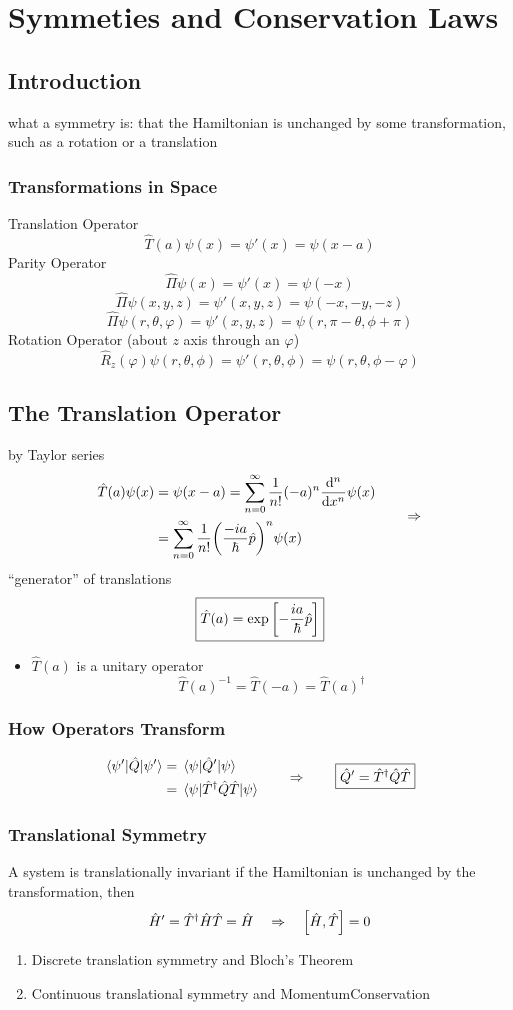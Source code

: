 \chapter{Symmeties and Conservation Laws}

\section{Introduction}
what a symmetry is: that the Hamiltonian is unchanged by some transformation, such as a rotation or a translation 
\subsection{Transformations in Space}
Translation Operator
\[\hat{T}(a)\psi(x)=\psi'(x)=\psi(x-a)\]
Parity Operator
\[\hat{\Pi}\psi(x)=\psi'(x)=\psi(-x)\]
\[\hat{\Pi}\psi(x,y,z)=\psi'(x,y,z)=\psi(-x,-y,-z)\]
\[\hat{\Pi}\psi(r,\theta,\varphi)=\psi'(x,y,z)=\psi(r,\pi-\theta,\phi+\pi)\]
Rotation Operator (about \(z\) axis through an \(\varphi\))
\[\hat{R}_z(\varphi)\psi(r,\theta,\phi)=\psi'(r,\theta,\phi)=\psi(r,\theta,\phi-\varphi)\]
\section{The Translation Operator}
by Taylor series
\[\begin{aligned}
    \hat{T}(a)\psi(x)&=\psi(x-a)=\sum_{n=0}^\infty\frac{1}{n!}(-a)^n\dv[n]{x}\psi(x) \\
                    &=\sum_{n=0}^\infty\frac{1}{n!}\qty(\frac{-ia}{\hbar}\hat{p})^n\psi(x)
\end{aligned}\qquad\Rightarrow\]
“generator” of translations
\[\boxed{
    \hat{T}(a)=\exp\qty[-\frac{ia}{\hbar}\hat{p}]
}\]
\begin{itemize}
    \item \(\hat{T}(a)\) is a unitary operator
    \[\hat{T}(a)^{-1}=\hat{T}(-a)=\hat{T}(a)^\dagger \]
\end{itemize}
\subsection{How Operators Transform}
\[\begin{aligned}
    \expval{\hat{Q}}{\psi'}&=\expval{\hat{Q}'}{\psi}\\ 
                         &=\expval{\hat{T}^\dagger\hat{Q}\hat{T}}{\psi}
\end{aligned}\qquad\Rightarrow\qquad\boxed{
    \hat{Q}'=\hat{T}^\dagger\hat{Q}\hat{T}
}\]
\subsection{Translational Symmetry}
A system is translationally invariant if the Hamiltonian is unchanged by the transformation, then
\[\hat{H}'=\hat{T}^\dagger\hat{H}\hat{T}=\hat{H}\quad\Rightarrow\quad\qty[\hat{H},\hat{T}]=0\]
\begin{enumerate}
    \item Discrete translation symmetry and Bloch's Theorem
    \item Continuous translational symmetry and MomentumConservation
\end{enumerate}
